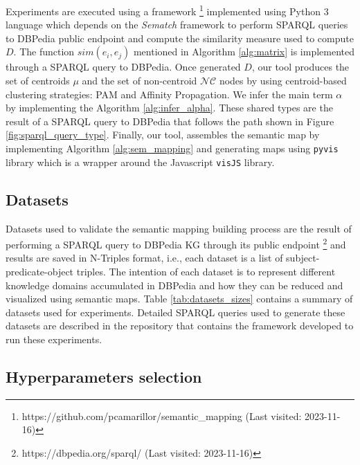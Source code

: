 \documentclass{ieeeaccess}
\begin{document}
Experiments are executed using a framework \footnote{https://github.com/pcamarillor/semantic\_mapping (Last visited: 2023-11-16)}  
 implemented using Python 3 language which depends on the
\textit{Sematch} framework \cite{ZHU201730} to perform SPARQL 
queries to DBPedia public endpoint and compute the similarity
measure used to compute $D$. The function $sim(e_{i}, e_{j})$
mentioned in Algorithm \ref{alg:matrix} is implemented through
a SPARQL query to DBPedia. Once generated $D$, our tool 
produces the set of centroids $\mu$ and the set of non-centroid
$\mathcal{NC}$ nodes by using centroid-based clustering
strategies: PAM and Affinity Propagation. We infer
the main term $\alpha$ by implementing the Algorithm
\ref{alg:infer_alpha}. These shared types are the
result of a SPARQL query to DBPedia that follows 
the path shown in Figure \ref{fig:sparql_query_type}. Finally, our tool, assembles the semantic map by 
implementing Algorithm \ref{alg:sem_mapping} and generating
maps using \texttt{pyvis} library which is a wrapper around
the Javascript \texttt{visJS} library.



\subsection{Datasets}

Datasets used to validate the semantic mapping
building process are the result of performing a
SPARQL query to DBPedia KG through its public endpoint 
\footnote{https://dbpedia.org/sparql/ (Last visited: 2023-11-16)} and results
are saved in N-Triples format, i.e., each dataset
is a list of subject-predicate-object triples. The
intention of each dataset is to represent different
knowledge domains accumulated in DBPedia and how they
can be reduced and visualized using semantic maps. 
Table \ref{tab:datasets_sizes} contains a summary
of datasets used for experiments. Detailed SPARQL
queries used to generate these datasets are
described in the repository that contains the
framework developed to run these experiments.



\subsection{Hyperparameters selection}
\end{document}
